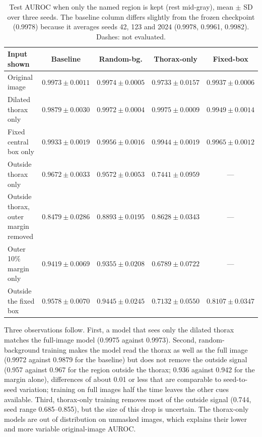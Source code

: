 \begin{table}[htbp]
\centering
\caption{Test AUROC when only the named region is kept (rest mid-gray), mean $\pm$ SD over three seeds.
The baseline column differs slightly from the frozen checkpoint (0.9978) because it averages seeds 42, 123 and
2024 (0.9978, 0.9961, 0.9982). Dashes: not evaluated.}
\label{tab:lung-aware}
\footnotesize
\setlength{\tabcolsep}{4pt}
\begin{tabular}{lcccc}
\toprule
Input shown & Baseline & Random-bg. & Thorax-only & Fixed-box \\
\midrule
Original image & $0.9973\pm0.0011$ & $0.9974\pm0.0005$ & $0.9733\pm0.0157$ & $0.9937\pm0.0006$ \\
Dilated thorax only & $0.9879\pm0.0030$ & $0.9972\pm0.0004$ & $0.9975\pm0.0009$ & $0.9949\pm0.0014$ \\
Fixed central box only & $0.9933\pm0.0019$ & $0.9956\pm0.0016$ & $0.9944\pm0.0019$ & $0.9965\pm0.0012$ \\
Outside thorax only & $0.9672\pm0.0033$ & $0.9572\pm0.0053$ & $0.7441\pm0.0959$ & --- \\
Outside thorax, outer margin removed & $0.8479\pm0.0286$ & $0.8893\pm0.0195$ & $0.8628\pm0.0343$ & --- \\
Outer 10\% margin only & $0.9419\pm0.0069$ & $0.9355\pm0.0208$ & $0.6789\pm0.0722$ & --- \\
Outside the fixed box & $0.9578\pm0.0070$ & $0.9445\pm0.0245$ & $0.7132\pm0.0550$ & $0.8107\pm0.0347$ \\
\bottomrule
\end{tabular}
\end{table}

Three observations follow. First, a model that sees only the dilated thorax matches the full-image model
(0.9975 against 0.9973). Second, random-background training makes the model read the thorax as well as the
full image (0.9972 against 0.9879 for the baseline) but does not remove the outside signal (0.957 against
0.967 for the region outside the thorax; 0.936 against 0.942 for the margin alone), differences of about 0.01
or less that are comparable to seed-to-seed variation; training on full images half the time leaves the other cues available. Third, thorax-only training
removes most of the outside signal (0.744, seed range 0.685--0.855), but the size of this drop is uncertain.
The thorax-only models are out of distribution on unmasked images, which explains their lower and more
variable original-image AUROC.

